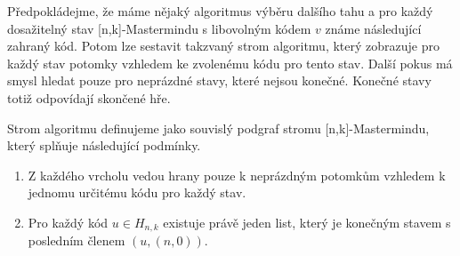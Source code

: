 Předpokládejme, že máme nějaký algoritmus výběru dalšího tahu a pro každý dosažitelný stav [n,k]-Mastermindu s libovolným kódem $v$ známe následující zahraný kód. Potom lze sestavit takzvaný strom algoritmu, který zobrazuje pro každý stav potomky vzhledem ke zvolenému kódu pro tento stav. Další pokus má smysl hledat pouze pro neprázdné stavy, které nejsou konečné. Konečné stavy totiž odpovídají skončené hře. 






\begin{definice}
  Strom algoritmu definujeme jako souvislý podgraf stromu [n,k]-Mastermindu, který splňuje následující podmínky.
  \begin{enumerate}
      \item Z každého vrcholu vedou hrany pouze k neprázdným potomkům vzhledem k jednomu určitému kódu pro každý stav. 
      \item Pro každý kód $u \in H_{n,k}$ existuje právě jeden list, který je konečným stavem s posledním členem $(u, (n,0))$. 
  \end{enumerate}
\end{definice}



